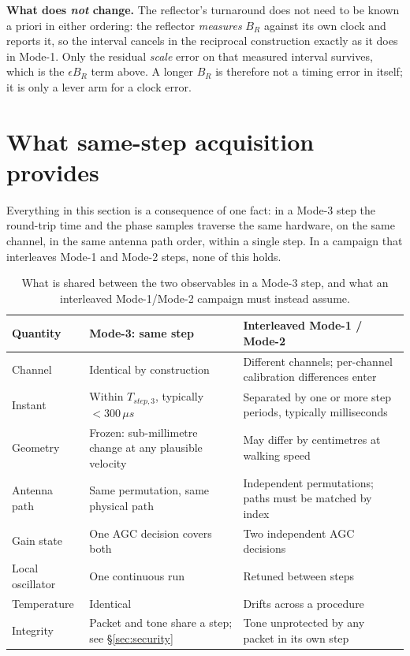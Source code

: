 \documentclass[11pt,a4paper]{article}
\newcommand{\us}{\,\ensuremath{\upmu}s}
\providecommand{\upmu}{\mu}
\begin{document}
\begin{callout}
\textbf{What does \emph{not} change.} The reflector's turnaround does not need to be known a priori
in either ordering: the reflector \emph{measures} $B_R$ against its own clock and reports it, so the
interval cancels in the reciprocal construction exactly as it does in Mode-1. Only the residual
\emph{scale} error on that measured interval survives, which is the $\epsilon B_R$ term above. A
longer $B_R$ is therefore not a timing error in itself; it is only a lever arm for a clock error.
\end{callout}

\section{What same-step acquisition provides}
\label{sec:shared}

Everything in this section is a consequence of one fact: in a Mode-3 step the round-trip time and
the phase samples traverse the same hardware, on the same channel, in the same antenna path order,
within a single step. In a campaign that interleaves Mode-1 and Mode-2 steps, none of this holds.

\begin{table}[h]
\caption{What is shared between the two observables in a Mode-3 step, and what an interleaved
Mode-1/Mode-2 campaign must instead assume.}
\label{tab:shared}
\centering\small
\begin{tabular}{@{}L{32mm}L{45mm}L{45mm}@{}}
\toprule
Quantity & Mode-3: same step & Interleaved Mode-1 / Mode-2 \\
\midrule
Channel & Identical by construction & Different channels; per-channel calibration differences enter \\
Instant & Within $T_{step,3}$, typically $<300\us$ & Separated by one or more step periods, typically milliseconds \\
Geometry & Frozen: sub-millimetre change at any plausible velocity & May differ by centimetres at walking speed \\
Antenna path & Same permutation, same physical path & Independent permutations; paths must be matched by index \\
Gain state & One AGC decision covers both & Two independent AGC decisions \\
Local oscillator & One continuous run & Retuned between steps \\
Temperature & Identical & Drifts across a procedure \\
Integrity & Packet and tone share a step; see \S\ref{sec:security} & Tone unprotected by any packet in its own step \\
\bottomrule
\end{tabular}
\end{table}
\end{document}
